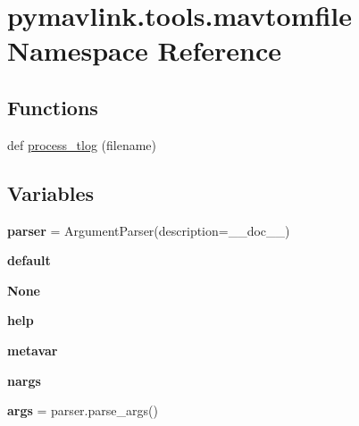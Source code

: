 \hypertarget{namespacepymavlink_1_1tools_1_1mavtomfile}{}\section{pymavlink.\+tools.\+mavtomfile Namespace Reference}
\label{namespacepymavlink_1_1tools_1_1mavtomfile}
\subsection*{Functions}
\begin{DoxyCompactItemize}
\item 
def \hyperlink{namespacepymavlink_1_1tools_1_1mavtomfile_aa9bda5eaab8f660bdd5f3a366ade93e3}{process\+\_\+tlog} (filename)
\end{DoxyCompactItemize}
\subsection*{Variables}
\begin{DoxyCompactItemize}
\item 
\mbox{\label{namespacepymavlink_1_1tools_1_1mavtomfile_af7ff9c2839aabb61ddecabc813328efc}} 
{\bfseries parser} = Argument\+Parser(description=\+\_\+\+\_\+doc\+\_\+\+\_\+)
\item 
\mbox{\label{namespacepymavlink_1_1tools_1_1mavtomfile_a94ea2c4b2ef375dc4d85e03b88ab15f6}} 
{\bfseries default}
\item 
\mbox{\label{namespacepymavlink_1_1tools_1_1mavtomfile_a0bf324c31825939e1d9e7aad626a48ac}} 
{\bfseries None}
\item 
\mbox{\label{namespacepymavlink_1_1tools_1_1mavtomfile_a8d08d0c14916bc0aa3e5f64ea850ba86}} 
{\bfseries help}
\item 
\mbox{\label{namespacepymavlink_1_1tools_1_1mavtomfile_a9ab176a8b95f4333b464080b95bf8546}} 
{\bfseries metavar}
\item 
\mbox{\label{namespacepymavlink_1_1tools_1_1mavtomfile_aace27b9425296856d5e9a23be1767d35}} 
{\bfseries nargs}
\item 
\mbox{\label{namespacepymavlink_1_1tools_1_1mavtomfile_a6e2cc01451a78fe594cca2991f09eff0}} 
{\bfseries args} = parser.\+parse\+\_\+args()
\end{DoxyCompactItemize}


